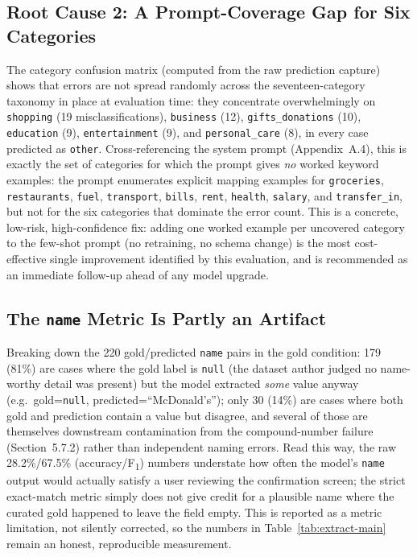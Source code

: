 \subsection{Root Cause 2: A Prompt-Coverage Gap for Six Categories}

The category confusion matrix (computed from the raw prediction capture) shows
that errors are not spread randomly across the seventeen-category taxonomy
in place at evaluation time:
they concentrate overwhelmingly on \texttt{shopping} (19 misclassifications),
\texttt{business} (12), \texttt{gifts\_donations} (10), \texttt{education} (9),
\texttt{entertainment} (9), and \texttt{personal\_care} (8), in every case
predicted as \texttt{other}. Cross-referencing the system prompt
(Appendix~A.4), this is exactly the set of categories for which the prompt
gives \emph{no} worked keyword examples: the prompt enumerates explicit mapping
examples for \texttt{groceries}, \texttt{restaurants}, \texttt{fuel},
\texttt{transport}, \texttt{bills}, \texttt{rent}, \texttt{health},
\texttt{salary}, and \texttt{transfer\_in}, but not for the six categories that
dominate the error count. This is a concrete, low-risk, high-confidence fix:
adding one worked example per uncovered category to the few-shot prompt (no
retraining, no schema change) is the most cost-effective single improvement
identified by this evaluation, and is recommended as an immediate follow-up
ahead of any model upgrade.

\subsection{The \texttt{name} Metric Is Partly an Artifact}

Breaking down the 220 gold/predicted \texttt{name} pairs in the gold condition:
179 (81\%) are cases where the gold label is \texttt{null} (the dataset author
judged no name-worthy detail was present) but the model extracted \emph{some}
value anyway (e.g.\ gold=\texttt{null}, predicted=``McDonald's''); only 30
(14\%) are cases where both gold and prediction contain a value but disagree,
and several of those are themselves downstream contamination from the
compound-number failure (Section~5.7.2) rather than independent naming errors.
Read this way, the raw 28.2\%/67.5\% (accuracy/F\textsubscript{1}) numbers
understate how often the model's \texttt{name} output would actually satisfy a
user reviewing the confirmation screen; the strict exact-match metric simply
does not give credit for a plausible name where the curated gold happened to
leave the field empty. This is reported as a metric limitation, not silently
corrected, so the numbers in Table~\ref{tab:extract-main} remain an honest,
reproducible measurement.

